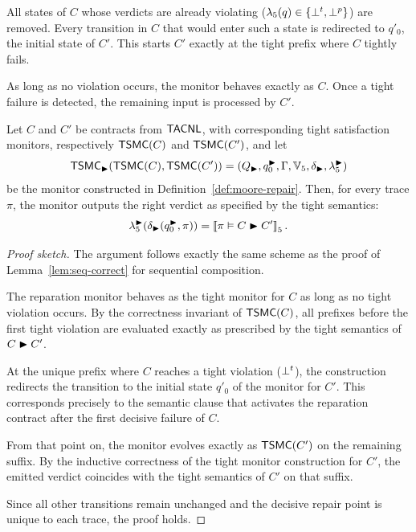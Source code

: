 All states of $C$ whose verdicts are already violating
($\lambda_5(q)\in\{\bot^t,\bot^p\}$) are removed. Every transition in $C$ that
would enter such a state is redirected to $q'_0$, the initial state of $C'$.
This starts $C'$ exactly at the tight prefix where $C$ tightly fails.  

As long as no violation occurs, the monitor behaves exactly as $C$. Once a tight failure is detected, the remaining input is processed by $C'$.

\begin{lemma}
\label{lem:rep-correct}
Let \(C\) and \(C'\) be contracts from \(\mathsf{TACNL}\), with corresponding tight satisfaction monitors, respectively \(\mathsf{TSMC}(C)\) and \(\mathsf{TSMC}(C')\), and let
\[
\mathsf{TSMC}_{\blacktriangleright}(\mathsf{TSMC}(C),\mathsf{TSMC}(C'))
  = (Q_{\blacktriangleright}, q_0^{\blacktriangleright}, \Gamma, \mathbb{V}_5 , \delta_{\blacktriangleright}, \lambda_5^{\blacktriangleright})
\]
be the monitor constructed in Definition~\ref{def:moore-repair}.
Then, for every trace $\pi$, the monitor outputs the right verdict as specified by the tight semantics:
\[
\lambda_5^{\blacktriangleright}(\delta_{\blacktriangleright}(q_0^{\blacktriangleright},\pi)) = \left\llbracket \pi \vDash C \blacktriangleright C' \right\rrbracket_{5}.
\]
\end{lemma}
\begin{proof}[Proof sketch]
The argument follows exactly the same scheme as the proof of
Lemma~\ref{lem:seq-correct} for sequential composition.

The reparation monitor behaves as the tight monitor for $C$ as long as no tight violation occurs.
By the correctness invariant of $\mathsf{TSMC}(C)$, all prefixes before the first tight violation are evaluated exactly as prescribed by the tight semantics of $C\blacktriangleright C'$.

At the unique prefix where $C$ reaches a tight violation ($\bot^t$), the construction redirects the transition to the initial state $q'_0$ of the monitor for $C'$.
This corresponds precisely to the semantic clause that activates the reparation contract after the first decisive failure of $C$.

From that point on, the monitor evolves exactly as $\mathsf{TSMC}(C')$ on the remaining suffix.
By the inductive correctness of the tight monitor construction for $C'$, the emitted verdict coincides with the tight semantics of $C'$ on that suffix.

Since all other transitions remain unchanged and the decisive repair point is unique to each trace, the proof holds.
\end{proof}






